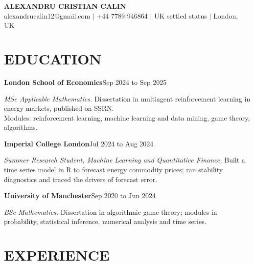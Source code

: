 \documentclass[a4paper,11pt]{article}
\newcommand{\entry}[2]{\vspace{2pt}\noindent\textbf{#1}\hfill #2\par\vspace{1pt}}
\begin{document}
\begin{center}
    {\Large \textbf{ALEXANDRU CRISTIAN CALIN}} \\ \vspace{3pt}
    \small alexandrucalin12@gmail.com $|$ +44 7789 946864 $|$ UK settled status $|$ London, UK
\end{center}
\vspace{-12pt}

\section{EDUCATION}

\entry{London School of Economics}{Sep 2024 to Sep 2025}
\noindent\textit{MSc Applicable Mathematics.} Dissertation in multiagent reinforcement learning in energy markets, published on SSRN.\\
Modules: reinforcement learning, machine learning and data mining, game theory, algorithms.
\vspace{2pt}

\entry{Imperial College London}{Jul 2024 to Aug 2024}
\noindent\textit{Summer Research Student, Machine Learning and Quantitative Finance.} Built a time series model in R to forecast energy commodity prices; ran stability diagnostics and traced the
drivers of forecast error.
\vspace{2pt}

\entry{University of Manchester}{Sep 2020 to Jun 2024}
\noindent\textit{BSc Mathematics.} Dissertation in algorithmic game theory; modules in probability, statistical inference, numerical analysis and time series.

\section{EXPERIENCE}
\end{document}
